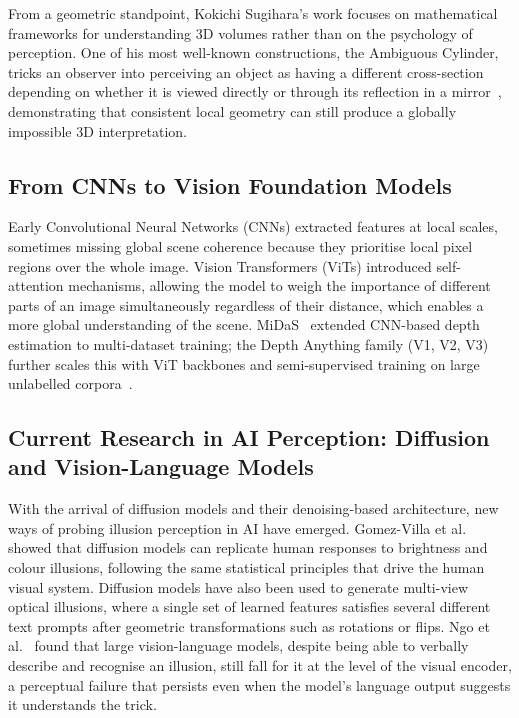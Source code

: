 \documentclass[10pt,twocolumn]{article}
\begin{document}
From a geometric standpoint, Kokichi Sugihara's work focuses on mathematical
frameworks for understanding 3D volumes rather than on the psychology of perception.
One of his most well-known constructions, the Ambiguous Cylinder, tricks an observer
into perceiving an object as having a different cross-section depending on whether it is
viewed directly or through its reflection in a mirror~\cite{sugihara2015}, demonstrating
that consistent local geometry can still produce a globally impossible 3D interpretation.

\subsection{From CNNs to Vision Foundation Models}

Early Convolutional Neural Networks (CNNs) extracted features at local scales, sometimes
missing global scene coherence because they prioritise local pixel regions over the whole
image. Vision Transformers (ViTs) introduced self-attention mechanisms, allowing the
model to weigh the importance of different parts of an image simultaneously regardless of
their distance, which enables a more global understanding of the scene.
MiDaS~\cite{ranftl2020} extended CNN-based depth estimation to multi-dataset training;
the Depth Anything family (V1, V2, V3) further scales this with ViT backbones and
semi-supervised training on large unlabelled corpora~\cite{depthanythingv1,
depthanythingv2, depthanythingv3}.

\subsection{Current Research in AI Perception: Diffusion and Vision-Language Models}

With the arrival of diffusion models and their denoising-based architecture, new ways of
probing illusion perception in AI have emerged. Gomez-Villa et al.~\cite{gomezVilla2025}
showed that diffusion models can replicate human responses to brightness and colour
illusions, following the same statistical principles that drive the human visual system.
Diffusion models have also been used to generate multi-view optical illusions, where a
single set of learned features satisfies several different text prompts after geometric
transformations such as rotations or flips. Ngo et al.~\cite{ngo2023} found that large
vision-language models, despite being able to verbally describe and recognise an
illusion, still fall for it at the level of the visual encoder, a perceptual failure that
persists even when the model's language output suggests it understands the trick.
\end{document}
